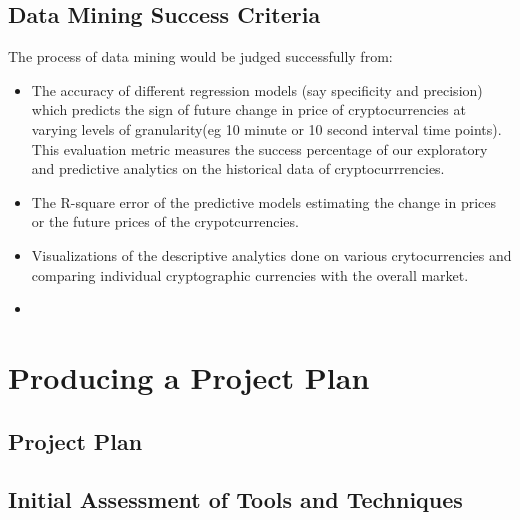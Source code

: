 \documentclass{article}
\begin{document}
\subsection{Data Mining Success Criteria}
The process of data mining would be judged successfully from:
\begin{itemize}
    \item The accuracy of different regression models (say specificity and precision) which predicts the sign of future change in price of cryptocurrencies at varying levels of granularity(eg 10 minute or 10 second interval time points). This evaluation metric measures the success percentage of our exploratory and predictive analytics on the historical data of cryptocurrrencies.
    \item The R-square error of the predictive models estimating the change in prices or the future prices of the crypotcurrencies.
    \item Visualizations of the descriptive analytics done on various crytocurrencies and comparing individual cryptographic currencies with the overall market.
    \item 
\end{itemize}

\section{Producing a Project Plan}
\subsection{Project Plan}

\subsection{Initial Assessment of Tools and Techniques}
\end{document}
